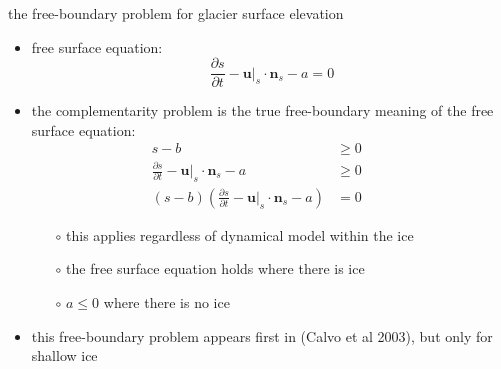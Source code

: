 \documentclass[10pt,svgnames]{beamer}
\newcommand{\bn}{\mathbf{n}}
\newcommand{\bu}{\mathbf{u}}
\newcommand{\aler}[1]{{\color{FireBrick} #1}}
\begin{document}
\begin{frame}{the free-boundary problem for glacier surface elevation}

\begin{itemize}
\item free surface equation:
   $$\frac{\partial s}{\partial t} - \bu|_s \cdot \bn_s - a = 0$$
\item the complementarity problem is the \aler{true free-boundary meaning of the free surface equation}:
\begin{align*}
s - b &\ge 0 &&\phantom{x} \\
\frac{\partial s}{\partial t} - \bu|_s \cdot \bn_s - a &\ge 0 \\
(s - b) \left(\frac{\partial s}{\partial t} - \bu|_s \cdot \bn_s - a\right) &= 0
\end{align*}

    \begin{itemize}
    \item[$\circ$] this applies regardless of dynamical model within the ice
    \item[$\circ$] the free surface equation holds where there is ice
    \item[$\circ$] $a\le 0$ where there is no ice
    \end{itemize}
\item this free-boundary problem appears first in (Calvo et al 2003), but only for shallow ice
\end{itemize}
\end{frame}
\end{document}
